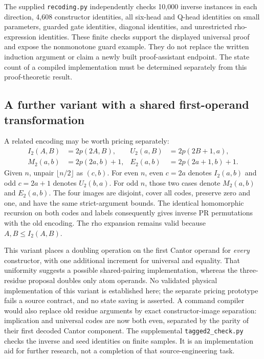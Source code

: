 The supplied \texttt{recoding.py} independently checks 10,000 inverse
instances in each direction, 4,608 constructor identities, all six-head
and Q-head identities on small parameters, guarded gate identities,
diagonal identities, and unrestricted rho-expression identities.  These
finite checks support the displayed universal proof and expose the
nonmonotone guard example.  They do not replace the written induction
argument or claim a newly built proof-assistant endpoint.  The state count
of a compiled implementation must be determined separately from this
proof-theoretic result.

\subsection{A further variant with a shared first-operand transformation}

A related encoding may be worth pricing separately:
\[
\begin{aligned}
 I_2(A,B)&=2p(2A,B),& U_2(a,B)&=2p(2B+1,a),\\
 M_2(a,b)&=2p(2a,b)+1,& E_2(a,b)&=2p(2a+1,b)+1.
\end{aligned}
\]
Given $n$, unpair $\lfloor n/2\rfloor$ as $(c,b)$.  For even $n$,
even $c=2a$ denotes $I_2(a,b)$ and odd $c=2a+1$ denotes $U_2(b,a)$.
For odd $n$, those two cases denote $M_2(a,b)$ and $E_2(a,b)$.
The four images are disjoint, cover all codes, preserve zero and one,
and have the same strict-argument bounds.  The identical homomorphic
recursion on both codes and labels consequently gives inverse PR
permutations with the old encoding.  The rho expansion remains valid
because $A,B\le I_2(A,B)$.

This variant places a doubling operation on the first Cantor operand for
\emph{every} constructor, with one additional increment for universal and
equality.  That uniformity suggests a possible shared-pairing
implementation, whereas the three-residue proposal doubles only atom
operands.  No validated physical implementation of this variant is
established here; the separate pricing prototype fails a source contract,
and no state saving is asserted.  A command compiler
would also replace old residue arguments by exact constructor-image
separation: implication and universal codes are now both even, separated
by the parity of their first decoded Cantor component.  The supplemental
\texttt{tagged2\_check.py} checks the inverse and seed identities on finite
samples.  It is an implementation aid for further research, not a
completion of that source-engineering task.
